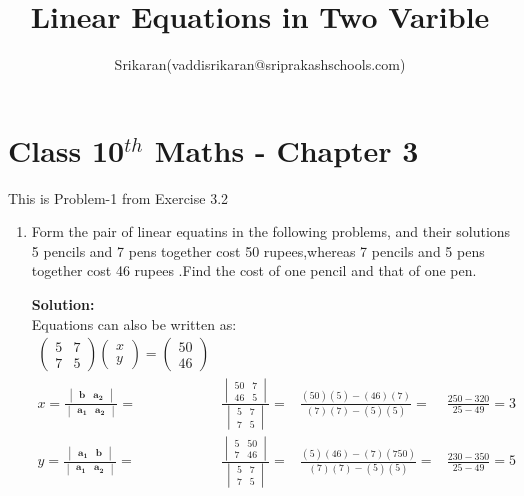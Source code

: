 \documentclass[12pt]{article}
\title{Linear Equations in Two Varible}
\author{Srikaran(vaddisrikaran@sriprakashschools.com)}
\newcommand{\myvec}[1]{\ensuremath{\begin{pmatrix}#1\end{pmatrix}}}
\newcommand{\mydet}[1]{\ensuremath{\begin{vmatrix}#1\end{vmatrix}}}
\newcommand{\solution}{\noindent \textbf{Solution: }}
\let\vec\mathbf
\begin{document}
\maketitle
\section*{Class 10$^{th}$ Maths - Chapter 3}
This is Problem-1 from Exercise 3.2
\begin{enumerate}
\item Form the pair of linear equatins in the following problems, and their solutions\\
5 pencils and 7 pens together cost 50 rupees,whereas 7 pencils and 5 pens together cost 46 rupees .Find the cost of one pencil and that of one pen.

\solution \\
            Equations  can also be written as:\\     
\begin{align}
\myvec{5&7\\7&5}\myvec{x\\y} = \myvec{50\\46}\\
x=\frac{\mydet{ \vec{b} & \vec{a_2}}}{\mydet{ \vec{a_1} &\vec{a_2} }} =&
\frac{\mydet{ 50 & 7 \\ 46 & 5 }}{\mydet{5&7\\7&5}} =&
\frac{(50)(5)-(46)(7)}{(7)(7)-(5)(5)} =&
\frac{250-320}{25-49} = 3 \\
y=\frac{\mydet{\vec{a_1}&\vec{b}}}{\mydet{\vec{a_1}&\vec{a_2}}} =&
\frac{\mydet{5&50\\7&46}}{\mydet{5&7\\7&5}} =&
\frac{(5)(46)-(7)(750)}{(7)(7)-(5)(5)} =&
\frac{230-350}{25-49} = 5\\
\end{align}

\end{enumerate}
\end{document}
